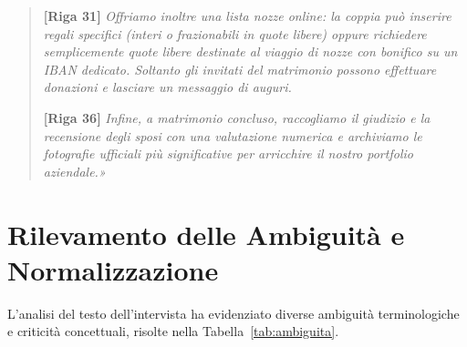 \begin{quote}
\textbf{[Riga 31]} \textit{Offriamo inoltre una lista nozze online: la coppia può inserire regali specifici (interi o frazionabili in quote libere) oppure richiedere semplicemente quote libere destinate al viaggio di nozze con bonifico su un IBAN dedicato. Soltanto gli invitati del matrimonio possono effettuare donazioni e lasciare un messaggio di auguri.}

\textbf{[Riga 36]} \textit{Infine, a matrimonio concluso, raccogliamo il giudizio e la recensione degli sposi con una valutazione numerica e archiviamo le fotografie ufficiali più significative per arricchire il nostro portfolio aziendale.»}
\end{quote}

\section{Rilevamento delle Ambiguità e Normalizzazione}
L'analisi del testo dell'intervista ha evidenziato diverse ambiguità terminologiche e criticità concettuali, risolte nella Tabella~\ref{tab:ambiguita}.

